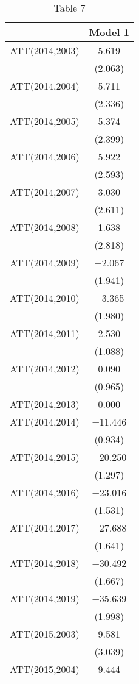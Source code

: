 \begin{table}

\caption{Table 7}
\centering
\begin{tabular}[t]{lc}
\toprule
  & Model 1\\
\midrule
ATT(2014,2003) & \num{5.619}\\
 & (\num{2.063})\\
ATT(2014,2004) & \num{5.711}\\
 & (\num{2.336})\\
ATT(2014,2005) & \num{5.374}\\
 & (\num{2.399})\\
ATT(2014,2006) & \num{5.922}\\
 & (\num{2.593})\\
ATT(2014,2007) & \num{3.030}\\
 & (\num{2.611})\\
ATT(2014,2008) & \num{1.638}\\
 & (\num{2.818})\\
ATT(2014,2009) & \num{-2.067}\\
 & (\num{1.941})\\
ATT(2014,2010) & \num{-3.365}\\
 & (\num{1.980})\\
ATT(2014,2011) & \num{2.530}\\
 & (\num{1.088})\\
ATT(2014,2012) & \num{0.090}\\
 & (\num{0.965})\\
ATT(2014,2013) & \num{0.000}\\
ATT(2014,2014) & \num{-11.446}\\
 & (\num{0.934})\\
ATT(2014,2015) & \num{-20.250}\\
 & (\num{1.297})\\
ATT(2014,2016) & \num{-23.016}\\
 & (\num{1.531})\\
ATT(2014,2017) & \num{-27.688}\\
 & (\num{1.641})\\
ATT(2014,2018) & \num{-30.492}\\
 & (\num{1.667})\\
ATT(2014,2019) & \num{-35.639}\\
 & (\num{1.998})\\
ATT(2015,2003) & \num{9.581}\\
 & (\num{3.039})\\
ATT(2015,2004) & \num{9.444}\\

\end{tabular}
\end{table}
